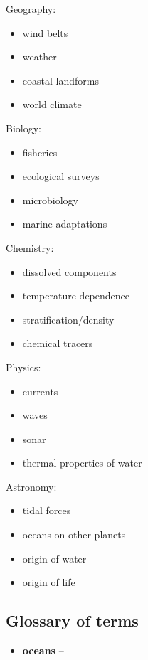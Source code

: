 Geography:
\begin{itemize}
	\item wind belts
	\item weather
	\item coastal landforms
	\item world climate
\end{itemize}

Biology:
\begin{itemize}
	\item fisheries
	\item ecological surveys
	\item microbiology
	\item marine adaptations
\end{itemize}

Chemistry:
\begin{itemize}
	\item dissolved components
	\item temperature dependence
	\item stratification/density
	\item chemical tracers
\end{itemize}

Physics:
\begin{itemize}
	\item currents
	\item waves
	\item sonar
	\item thermal properties of water
\end{itemize}

Astronomy:
\begin{itemize}
	\item tidal forces
	\item oceans on other planets
	\item origin of water
	\item origin of life
\end{itemize}

\subsection{Glossary of terms}

\begin{itemize}
	\item \textbf{oceans} -- 
\end{itemize}
